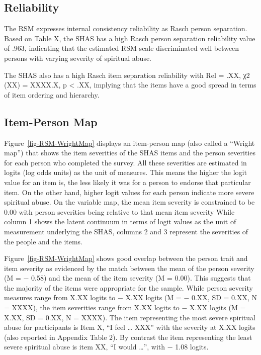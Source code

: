 \documentclass[
  letterpaper,
]{article}
\begin{document}
\hypertarget{reliability}{%
\subsection*{Reliability}\label{reliability}}

The RSM expresses internal consistency reliability as Rasch person
separation. Based on Table X, the SHAS has a high Rasch person
separation reliability value of .963, indicating that the estimated RSM
scale discriminated well between persons with varying severity of
spiritual abuse.

The SHAS also has a high Rasch item separation reliability with Rel =
.XX, χ2 (XX) = XXXX.X, p \textless{} .XX, implying that the items have a
good spread in terms of item ordering and hierarchy.

\hypertarget{item-person-map}{%
\subsection*{Item-Person Map}\label{item-person-map}}

Figure~\ref{fig-RSM-WrightMap} displays an item-person map (also called
a ``Wright map'') that shows the item severities of the SHAS items and
the person severities for each person who completed the survey. All
these severities are estimated in logits (log odds units) as the unit of
measures. This means the higher the logit value for an item is, the less
likely it was for a person to endorse that particular item. On the other
hand, higher logit values for each person indicate more severe spiritual
abuse. On the variable map, the mean item severity is constrained to be
0.00 with person severities being relative to that mean item severity
While column 1 shows the latent continuum in terms of logit values as
the unit of measurement underlying the SHAS, columns 2 and 3 represent
the severities of the people and the items.

Figure~\ref{fig-RSM-WrightMap} shows good overlap between the person
trait and item severity as evidenced by the match between the mean of
the person severity (M = − 0.58) and the mean of the item severity (M =
0.00). This suggests that the majority of the items were appropriate for
the sample. While person severity measures range from X.XX logits to −
X.XX logits (M = − 0.XX, SD = 0.XX, N = XXXX), the item severities range
from X.XX logits to − X.XX logits (M = X.XX, SD = 0.XX, N = XXXX). The
item representing the most severe spiritual abuse for participants is
Item X, ``I feel \ldots{} XXX'' with the severity at X.XX logits (also
reported in Appendix Table 2). By contrast the item representing the
least severe spiritual abuse is item XX, ``I would \ldots{}'', with −
1.08 logits.
\end{document}
